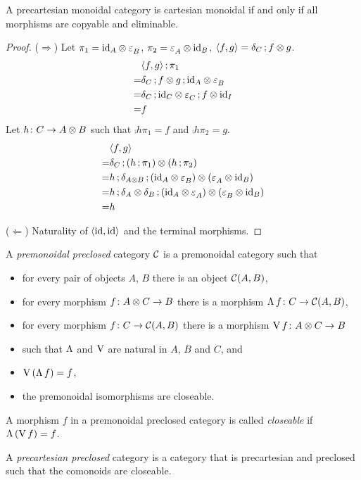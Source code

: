 \documentclass[runningheads,envcountsame]{llncs}
\begin{document}
\begin{lemma}
    A precartesian monoidal category is cartesian monoidal if and only if all morphisms are copyable and eliminable. 
\end{lemma}
\begin{proof}
    ($\Longrightarrow$) Let $\pi_1 = \tensor{\id_A}{\terminal_B}$, $\pi_2 = \tensor{\terminal_A}{\id_B}$, $\langle f, g \rangle = \comp{\dup_C}{\tensor{f}{g}}$.
    \begin{align}
        & \comp{\langle f, g \rangle}{\pi_1} \\
      = & \comp{\comp{\dup_C}{\tensor{f}{g}}}{\tensor{\id_A}{\terminal_B}} \\
      = & \comp{\comp{\dup_C}{\tensor{\id_C}{\terminal_C}}}{\tensor{f}{\id_I}} \\
      = & f
    \end{align}
    Let $h\colon C \to \tensor{A}{B}$ such that $\comp{h}{\pi_1} = f$ and $\comp{h}{\pi_2} = g$.
    \begin{align}
        & \langle f, g \rangle \\
      = & \comp{\dup_C}{\tensor{(\comp{h}{\pi_1})}{(\comp{h}{\pi_2})}} \\
      = & \comp{h}{\comp{\dup_{\tensor{A}{B}}}{\tensor{(\tensor{\id_A}{\terminal_B})}{(\tensor{\terminal_A}{\id_B})}}} \\
      = & \comp{h}{\comp{\tensor{\dup_A}{\dup_B}}{\tensor{(\tensor{\id_A}{\terminal_A})}{(\tensor{\terminal_B}{\id_B})}}} \\
      = & h
    \end{align}
    
    ($\Longleftarrow$) Naturality of $\langle \id, \id \rangle$ and the terminal morphisms. 
\end{proof}

\begin{definition}
    A \emph{premonoidal preclosed} category $\mathcal{C}$ is a premonoidal category such that 
    \begin{itemize}
        \item for every pair of objects $A$, $B$ there is an object $\mathcal{C}(A, B)$,
        \item for every morphism $f\colon \tensor{A}{C} \to B$ there is a morphism $\curry\,f\colon C \to \homC{A}{B}$,
        \item for every morphism $f\colon C \to \mathcal{C}(A, B)$ there is a morphism $\uncurry\,f\colon \tensor{A}{C} \to B$
        \item such that $\curry$ and $\uncurry$ are natural in $A$, $B$ and $C$, and
        \item $\uncurry\,(\curry\,f) = f$,
        \item the premonoidal isomorphisms are closeable.
    \end{itemize}
    
    A morphism $f$ in a premonoidal preclosed category is called \emph{closeable} if $\curry\,(\uncurry\,f) = f$.
    
    A \emph{precartesian preclosed} category is a category that is precartesian and preclosed such that the comonoids are closeable.
\end{definition}
\end{document}
